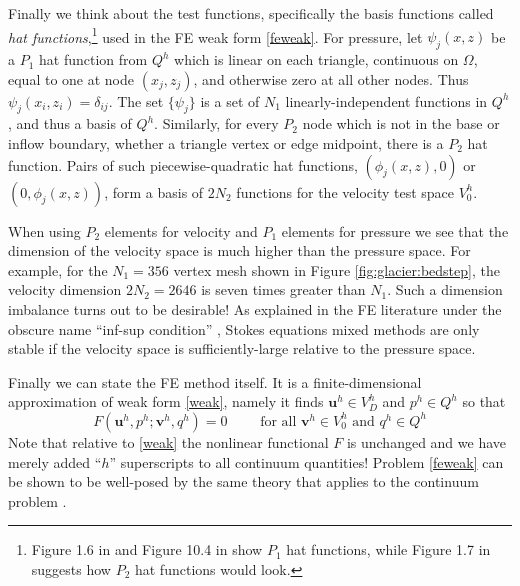 \documentclass[letterpaper,final,12pt,reqno]{amsart}
\newcommand{\bu}{\mathbf{u}}
\newcommand{\bv}{\mathbf{v}}
\begin{document}
Finally we think about the test functions, specifically the basis functions called \emph{hat functions},\footnote{Figure 1.6 in \cite{Elmanetal2014} and Figure 10.4 in \cite{Bueler2021} show $P_1$ hat functions, while Figure 1.7 in \cite{Elmanetal2014} suggests how $P_2$ hat functions would look.} used in the FE weak form \eqref{feweak}.  For pressure, let $\psi_j(x,z)$ be a $P_1$ hat function from $Q^h$ which is linear on each triangle, continuous on $\Omega$, equal to one at node $(x_j,z_j)$, and otherwise zero at all other nodes.  Thus $\psi_j(x_i,z_i) = \delta_{ij}$.  The set $\{\psi_j\}$ is a set of $N_1$ linearly-independent functions in $Q^h$, and thus a basis of $Q^h$.  Similarly, for every $P_2$ node which is not in the base or inflow boundary, whether a triangle vertex or edge midpoint, there is a $P_2$ hat function.  Pairs of such piecewise-quadratic hat functions, $(\phi_j(x,z),0)$ or $(0,\phi_j(x,z))$, form a basis of $2N_2$ functions for the velocity test space $V_0^h$.

When using $P_2$ elements for velocity and $P_1$ elements for pressure we see that the dimension of the velocity space is much higher than the pressure space.  For example, for the $N_1=356$ vertex mesh shown in Figure \ref{fig:glacier:bedstep}, the velocity dimension $2N_2=2646$ is seven times greater than $N_1$.  Such a dimension imbalance turns out to be desirable!  As explained in the FE literature under the obscure name ``inf-sup condition'' \cite{Braess2007,Bueler2021,Elmanetal2014}, Stokes equations mixed methods are only stable if the velocity space is sufficiently-large relative to the pressure space.

Finally we can state the FE method itself.  It is a finite-dimensional approximation of weak form \eqref{weak}, namely it finds $\bu^h \in V_D^h$ and $p^h \in Q^h$ so that
\begin{equation}
F(\bu^h,p^h;\bv^h,q^h) = 0 \qquad \text{ for all } \bv^h\in V_0^h \text{ and } q^h\in Q^h  \label{feweak}
\end{equation}
Note that relative to \eqref{weak} the nonlinear functional $F$ is unchanged and we have merely added ``$h$'' superscripts to all continuum quantities!  Problem \eqref{feweak} can be shown to be well-posed by the same theory that applies to the continuum problem \cite[Theorem 4.3]{JouvetRappaz2011}.
\end{document}
